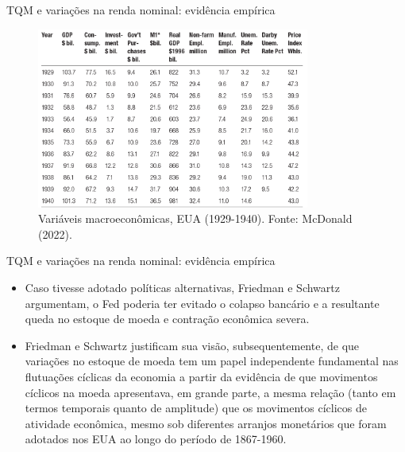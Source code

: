 \documentclass[10pt]{beamer}
\begin{document}
\begin{frame}{TQM e variações na renda nominal: evidência empírica}
    \begin{figure}
        \centering
        \includegraphics[width=0.8\textwidth]{./figures/aula10_fig5.PNG}
        \caption{Variáveis macroeconômicas, EUA (1929-1940). Fonte: McDonald (2022).}
        \label{fig5}
    \end{figure}
\end{frame}

\begin{frame}{TQM e variações na renda nominal: evidência empírica}
    \begin{itemize}
        \item Caso tivesse adotado políticas alternativas, Friedman e Schwartz argumentam, o Fed poderia ter evitado o colapso bancário e a resultante queda no estoque de moeda e contração econômica severa.
        \bigskip
        \item Friedman e Schwartz justificam sua visão, subsequentemente, de que variações no estoque de moeda tem um papel independente fundamental nas flutuações cíclicas da economia a partir da evidência de que movimentos cíclicos na moeda apresentava, em grande parte, a mesma relação (tanto em termos temporais quanto de amplitude) que os movimentos cíclicos de atividade econômica, mesmo sob diferentes arranjos monetários que foram adotados nos EUA ao longo do período de 1867-1960.
    \end{itemize}
\end{frame}
\end{document}

